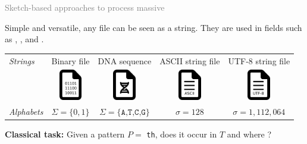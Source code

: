 \begin{frame}{\textcolor{gray}{Sketch-based approaches to process massive }}
    
    \small
    Simple and versatile, any file can be seen as a string.\pause
    They are used in fields such as , , and .\pause

    \medskip
    \begin{tabular}{l  c c c c}
        \emph{Strings} & Binary file & DNA sequence & ASCII string file & UTF-8 string file \\
        \rule{0pt}{10ex}    
        &
        \includegraphics[width=1cm]{pictures/file-bin.png}&
        \includegraphics[width=1cm]{pictures/file-dna.png}&
        \includegraphics[width=1cm]{pictures/file-ascii.png}&
        \includegraphics[width=1cm]{pictures/file-utf-8.png}
        \\
        \rule{0pt}{4ex}  
        \emph{Alphabets} & $\Sigma=\{0,1\}$ & $\Sigma=\{\texttt{A,T,C,G}\}$ & $\sigma=128$ & $\sigma = 1,112,064$\\
    \end{tabular}\pause
    \bigskip

    \textbf{Classical task:} \pause Given a pattern $P =$ \texttt{th}, does it occur in  $T$ and where ?
    
    \begin{center}
        \\
    \end{center}

\end{frame}


